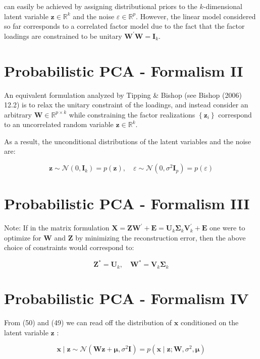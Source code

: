 \documentclass[11pt]{article}
\theoremstyle{plain} %
\theoremstyle{remark}
\begin{document}
can easily be achieved by assigning distributional priors to the $k$-dimensional latent variable $\mathbf{z} \in \mathbb{R}^{k}$ and the noise $\varepsilon \in \mathbb{R}^{p}$. However, the linear model considered so far corresponds to a correlated factor model due to the fact that the factor loadings are constrained to be unitary $\mathbf{W}^{\prime} \mathbf{W}=\mathbf{I}_{k}$.

\section*{Probabilistic PCA - Formalism II}
An equivalent formulation analyzed by Tipping \& Bishop (see Bishop (2006) 12.2) is to relax the unitary constraint of the loadings, and instead consider an arbitrary $\mathbf{W} \in \mathbb{R}^{p \times k}$ while constraining the factor realizations $\left\{\mathbf{z}_{i}\right\}$ correspond to an uncorrelated random variable $\mathbf{z} \in \mathbb{R}^{k}$.

As a result, the unconditional distributions of the latent variables and the noise are:

$$
\mathbf{z} \sim \mathcal{N}\left(0, \mathbf{I}_{k}\right)=p(\mathbf{z}), \quad \varepsilon \sim \mathcal{N}\left(0, \sigma^{2} \mathbf{I}_{p}\right)=p(\varepsilon)
$$

\section*{Probabilistic PCA - Formalism III}
Note: If in the matrix formulation $\mathbf{X}=\mathbf{Z W}^{\prime}+\mathbf{E}=\mathbf{U}_{k} \boldsymbol{\Sigma}_{k} \mathbf{V}_{k}^{\prime}+\mathbf{E}$ one were to optimize for $\mathbf{W}$ and $\mathbf{Z}$ by minimizing the reconstruction error, then the above choice of constraints would correspond to:

$$
\mathbf{Z}^{*}=\mathbf{U}_{k}, \quad \mathbf{W}^{*}=\mathbf{V}_{k} \boldsymbol{\Sigma}_{k}
$$

\section*{Probabilistic PCA - Formalism IV}
From (50) and (49) we can read off the distribution of $\mathbf{x}$ conditioned on the latent variable $\mathbf{z}$ :

$$
\mathbf{x} \mid \mathbf{z} \sim \mathcal{N}\left(\mathbf{W} \mathbf{z}+\boldsymbol{\mu}, \sigma^{2} \mathbf{I}\right)=p\left(\mathbf{x} \mid \mathbf{z} ; \mathbf{W}, \sigma^{2}, \boldsymbol{\mu}\right)
$$
\end{document}
